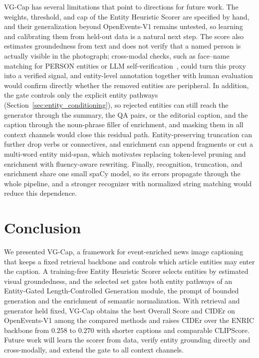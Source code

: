 \documentclass[runningheads]{llncs}
\DeclareRobustCommand{\aciids}[1]{{\color{olive}#1}}
\DeclareRobustCommand{\revise}[1]{{\color{olive}#1}}
\DeclareRobustCommand{\aciids}[1]{#1}
\DeclareRobustCommand{\revise}[1]{#1}
\begin{document}
\revise{VG-Cap has several limitations that point to directions for future work. The weights, threshold, and cap of the Entity Heuristic Scorer are specified by hand, and their generalization beyond OpenEvents-V1 remains untested, so learning and calibrating them from held-out data is a natural next step. The score also estimates groundedness from text and does not verify that a named person is actually visible in the photograph; cross-modal checks, such as face--name matching for PERSON entities or LLM self-verification~\cite{asai2024selfrag}, could turn this proxy into a verified signal, and entity-level annotation together with human evaluation would confirm directly whether the removed entities are peripheral. In addition, the gate controls only the explicit entity pathways (Section~\ref{sec:entity_conditioning}), so rejected entities can still reach the generator through the summary, the QA pairs, or the editorial caption\revise{, and the caption through the noun-phrase filler of enrichment}, and masking them in all context channels would close this residual path. Entity-preserving truncation can further drop verbs or connectives, and enrichment can append fragments or cut a multi-word entity mid-span, which motivates replacing token-level pruning and enrichment with fluency-aware rewriting. Finally, recognition, truncation, and enrichment share one small spaCy model, so its errors propagate through the whole pipeline, and a stronger recognizer with normalized string matching would reduce this dependence.}

\section{Conclusion}
\label{sec:conclusion}

\aciids{We presented VG-Cap, a framework for event-enriched news image captioning that keeps a fixed retrieval backbone and controls which article entities may enter the caption. A training-free Entity Heuristic Scorer selects entities by estimated visual groundedness, and the selected set gates both entity pathways of an Entity-Gated Length-Controlled Generation module, the prompt of bounded generation and the enrichment of semantic normalization. With retrieval and generator held fixed, VG-Cap obtains the best Overall Score and CIDEr on OpenEvents-V1 among the compared methods and raises CIDEr over the ENRIC backbone from $0.258$ to $0.270$ with shorter captions and comparable CLIPScore. Future work will learn the scorer from data, verify entity grounding directly and cross-modally, and extend the gate to all context channels.}
\end{document}
